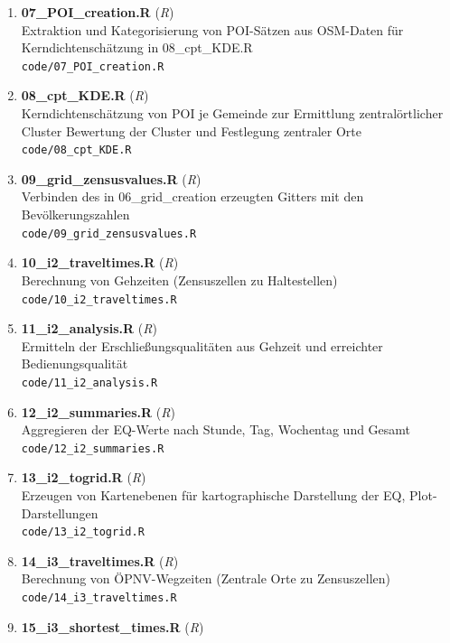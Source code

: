\begin{enumerate}[label=\arabic*., leftmargin=*, itemsep=0.5em, topsep=0.3em]
\begin{enumerate}[label=\arabic{enumi}.\arabic*, leftmargin=*, itemsep=0.5em, topsep=0.3em]
\texttt{\small code/06\_grid\_creation.R}
\item \textbf{07\_POI\_creation.R} \textnormal{(\textit{R})}\\
Extraktion und Kategorisierung von POI-Sätzen aus OSM-Daten für Kerndichtenschätzung in 08\_cpt\_KDE.R\\
\texttt{\small code/07\_POI\_creation.R}
\item \textbf{08\_cpt\_KDE.R} \textnormal{(\textit{R})}\\
Kerndichtenschätzung von POI je Gemeinde zur Ermittlung zentralörtlicher Cluster
Bewertung der Cluster und Festlegung zentraler Orte\\
\texttt{\small code/08\_cpt\_KDE.R}
\item \textbf{09\_grid\_zensusvalues.R} \textnormal{(\textit{R})}\\
Verbinden des in 06\_grid\_creation erzeugten Gitters mit den Bevölkerungszahlen\\
\texttt{\small code/09\_grid\_zensusvalues.R}
\item \textbf{10\_i2\_traveltimes.R} \textnormal{(\textit{R})}\\
Berechnung von Gehzeiten (Zensuszellen zu Haltestellen)\\
\texttt{\small code/10\_i2\_traveltimes.R}
\item \textbf{11\_i2\_analysis.R} \textnormal{(\textit{R})}\\
Ermitteln der Erschließungsqualitäten aus Gehzeit und erreichter Bedienungsqualität\\
\texttt{\small code/11\_i2\_analysis.R}
\item \textbf{12\_i2\_summaries.R} \textnormal{(\textit{R})}\\
Aggregieren der EQ-Werte nach Stunde, Tag, Wochentag und Gesamt\\
\texttt{\small code/12\_i2\_summaries.R}
\item \textbf{13\_i2\_togrid.R} \textnormal{(\textit{R})}\\
Erzeugen von Kartenebenen für kartographische Darstellung der EQ, Plot-Darstellungen\\
\texttt{\small code/13\_i2\_togrid.R}
\item \textbf{14\_i3\_traveltimes.R} \textnormal{(\textit{R})}\\
Berechnung von ÖPNV-Wegzeiten (Zentrale Orte zu Zensuszellen)\\
\texttt{\small code/14\_i3\_traveltimes.R}
\item \textbf{15\_i3\_shortest\_times.R} \textnormal{(\textit{R})}\\

\end{enumerate}
\end{enumerate}
